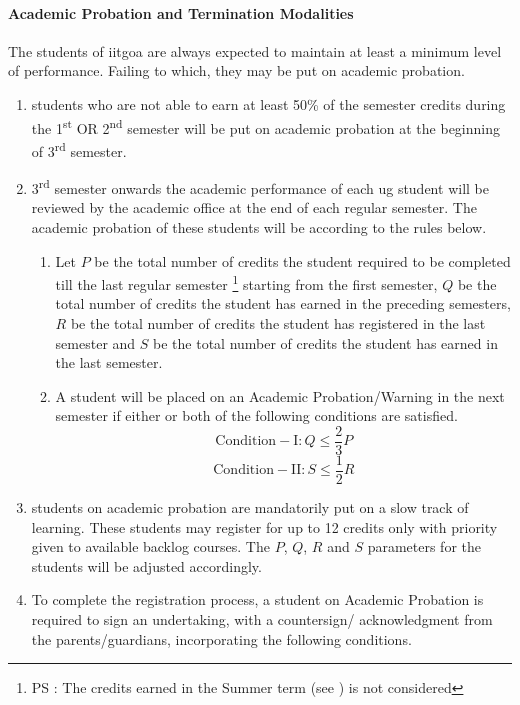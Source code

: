 \paragraph{Academic Probation and Termination Modalities} The \glspl{student} of \acrshort{iitgoa} are always expected to maintain at least a minimum level of performance. Failing to which, they may be put on academic probation.

\begin{enumerate}[leftmargin=15mm, resume]
    \item \Glspl{student} who are not able to earn at least 50\% of the semester credits during the 1\textsuperscript{st} OR 2\textsuperscript{nd} semester will be put on academic probation at the beginning of 3\textsuperscript{rd} semester.
    \item 3\textsuperscript{rd} semester onwards the academic performance of each \acrshort{ug} \gls{student} will be reviewed by the academic office at the end of each regular semester. The academic probation of these \glspl{student} will be according to the rules below.

    \begin{enumerate}
        \item Let $P$ be the total number of credits the \gls{student} required to be completed till the last regular semester \footnote{PS : The credits earned in the Summer term 
(see ) is not considered} starting from the first semester, $Q$ be the total number of credits the \gls{student} has earned in the preceding semesters, $R$ be the total number of credits the \gls{student} has registered in the last semester and $S$ be the total number of credits the \gls{student} has earned in the last semester.
        \item A \gls{student} will be placed on an Academic Probation/Warning in the next semester if either or both of the following conditions are satisfied.
    \begin{equation}
        \mathrm{Condition-I} : Q \leq \frac{2}{3}P
        \end{equation}
    \begin{equation}
        \mathrm{Condition-II} : S\leq \frac{1}{2}R
    \end{equation}
        
    \end{enumerate}

    \item \Glspl{student} on academic probation are mandatorily put on a slow track of learning. These \glspl{student} may register for up to 12 credits only with priority given to available backlog courses. The  $P$, $Q$, $R$ and $S$ parameters for the \glspl{student} will be adjusted accordingly.
    \item To complete the registration process, a \gls{student} on Academic Probation is required to sign an undertaking, with a countersign/ acknowledgment from the parents/guardians, incorporating the following conditions. 


\end{enumerate}
